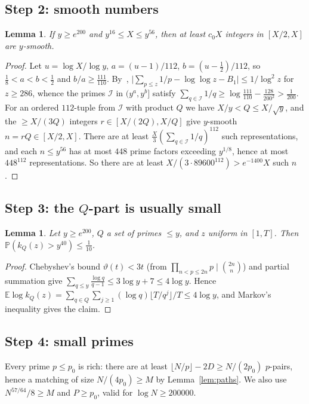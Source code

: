 \documentclass[11pt]{amsart}
\newtheorem{lemma}[theorem]{Lemma}
\theoremstyle{definition}
\theoremstyle{remark}
\newcommand{\E}{\mathbb{E}}
\newcommand{\PP}{\mathbb{P}}
\newcommand{\abs}[1]{\lvert #1\rvert}
\newcommand{\floor}[1]{\lfloor #1\rfloor}
\newcommand{\cI}{\mathcal{I}}
\begin{document}
\subsection{Step 2: smooth numbers}
\begin{lemma}\label{lem:smooth}
If $y\ge e^{200}$ and $y^{16}\le X\le y^{56}$, then at least $c_0X$ integers in $[X/2,X]$ are $y$-smooth.
\end{lemma}
\begin{proof}
Let $u=\log X/\log y$, $a=(u-1)/112$, $b=(u-\frac12)/112$, so $\frac18<a<b<\frac12$ and $b/a\ge\frac{111}{110}$. By~\cite[Thm.~5]{RS62}, $\abs{\sum_{p\le z}1/p-\log\log z-B_1}\le1/\log^2z$ for $z\ge286$, whence the primes $\cI$ in $(y^a,y^b]$ satisfy $\sum_{q\in\cI}1/q\ge\log\frac{111}{110}-\frac{128}{200^2}>\frac1{200}$. For an ordered $112$-tuple from $\cI$ with product $Q$ we have $X/y<Q\le X/\sqrt y$, and the $\ge X/(3Q)$ integers $r\in[X/(2Q),X/Q]$ give $y$-smooth $n=rQ\in[X/2,X]$. There are at least $\frac X3(\sum_{q\in\cI}1/q)^{112}$ such representations, and each $n\le y^{56}$ has at most $448$ prime factors exceeding $y^{1/8}$, hence at most $448^{112}$ representations. So there are at least $X/(3\cdot89600^{112})>e^{-1400}X$ such $n$.
\end{proof}

\subsection{Step 3: the $Q$-part is usually small}
\begin{lemma}\label{lem:kQ}
Let $y\ge e^{200}$, $Q$ a set of primes $\le y$, and $z$ uniform in $[1,T]$. Then $\PP(k_Q(z)>y^{40})\le\frac1{10}$.
\end{lemma}
\begin{proof}
Chebyshev's bound $\vartheta(t)<3t$ (from $\prod_{n<p\le2n}p\mid\binom{2n}n$) and partial summation give $\sum_{q\le y}\frac{\log q}{q-1}\le3\log y+7\le4\log y$. Hence $\E\log k_Q(z)=\sum_{q\in Q}\sum_{j\ge1}(\log q)\floor{T/q^j}/T\le4\log y$, and Markov's inequality gives the claim.
\end{proof}

\subsection{Step 4: small primes}
Every prime $p\le p_0$ is rich: there are at least $\floor{N/p}-2D\ge N/(2p_0)$ $p$-pairs, hence a matching of size $N/(4p_0)\ge M$ by Lemma~\ref{lem:paths}. We also use $N^{57/64}/8\ge M$ and $P\ge p_0$, valid for $\log N\ge200000$.
\end{document}
